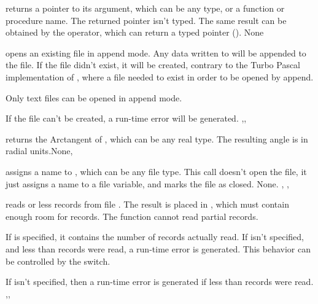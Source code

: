 \documentclass{report}
\begin{document}


{ returns a pointer to its argument, which can be any type, or a
function or procedure name. The returned pointer isn't typed.
The same result can be obtained by the  operator, which can return a
typed pointer (\progref). }
{None}
{}



{ opens an existing file in append mode. Any data written to
 will be appended to the file. If the file didn't exist, it will be
created, contrary to the Turbo Pascal implementation of , where
a file needed to exist in order to be opened by
append.

Only text files can be opened in append mode.
}
{If the file can't be created, a run-time error will be generated.}
{,, }



{ returns the Arctangent of , which can be any real type.
The resulting angle is in radial units.}{None}{, }



{ assigns a name to , which can be any file type.
This call doesn't open the file, it just assigns a name to a file variable,
and marks the file as closed.}
{None.}
{, , }



{ reads  or less records from file . The
result is placed in , which must contain enough room for
 records. The function cannot read partial records. 

If  is specified, it contains the number of records actually
read. If  isn't specified, and less than  records were
read, a run-time error is generated. This behavior can be controlled by the
 switch. }
{If  isn't specified, then a run-time error is generated if less
than  records were read.}
{,, }


\end{document}
